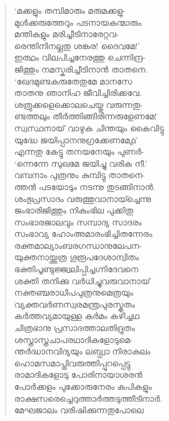 \begin{verse}
‘മക്കളും തമ്പിമാരും മരുമക്കളു-\\
മുള്‍ക്കരുത്തേറും പടനായകന്മാരും\\
മന്തികളും മരിച്ചീടിനാരേറ്റവ-\\
രെന്തിനിനല്ലതു ശങ്കര! ദൈവമേ!’\\
ഇത്ഥം വിലപിച്ചനേരത്തു ചെന്നിന്ദ്ര-\\
ജിത്തും നമസ്കരിച്ചീടിനാന്‍ താതനെ.\\
‘ഖേദമുണ്ടകരുതേതുമേ മാനസേ\\
താതനു ഞാനിഹ ജീവിച്ചിരിക്കവേ.\\
ശത്രുക്കളെക്കൊലചെയ്തു വരുന്നതു-\\
ണ്ടത്തലും തീര്‍ത്തിങ്ങിരിന്നരുളേണമേ!\\
സ്വസ്ഥനായ് വാഴുക ചിന്തയും കൈവിട്ടു\\
യുദ്ധേ ജയിപ്പാനനുഗ്രക്കേണമേ൧’\\
എന്നതു കേട്ടു തനയനേയും പുണര്‍-\\
‘ന്നെന്നേ സുഖമേ ജയിച്ചു വരിക നീ.’\\
വമ്പനാം പുത്രനും കുമ്പിട്ടു താതനെ-\\
ത്തന്‍ പടയോടും നടന്നു തുടങ്ങിനാന്‍.\\
ശംഭുപ്രസാദം വരുത്തുവാനായ്ച്ചെന്നു\\
ജംഭാരിജിത്തും നികുംഭില പുക്കിതു\\
സംഭാരജാലവും സമ്പാദ്യ സാദരം\\
സംഭാവ്യ ഹോംഅമാരംഭിച്ചിതന്നേരം\\
രക്തമാല്യാംബരഗന്ധാനുലേപന-\\
യുക്തനായ്ത്തത്ര ഗൂരൂപദേശാന്വിതം\\
ഭക്തിപൂണ്ടുജ്ജ്വലിപ്പിച്ചഗ്നിദേവനെ\\
ശക്തി തനിക്കു വര്‍ധിച്ചുവരുവാനായ്\\
നക്തഞ്ചരാധിപപുത്രനുമെത്രയും\\
വ്യക്തവര്‍ണസ്വരമന്ത്രപുരസ്കൃതം\\
കര്‍ത്തവ്യമായുള്ള കര്‍മം കഴിച്ചഥ\\
ചിത്രഭാനു പ്രസാദത്താലതിദ്രുതം\\
ശസ്ത്രാസ്ത്രചാപരഥാദികളോടുമെ-\\
ന്തര്‍ദ്ധാനവിദ്യയും ലബ്ധ്വാ നിരാകുലം\\
ഹൊമസമാപ്തിവരുത്തിപ്പുറപ്പെട്ടു\\
രാമാദികളോടു പോരിനായാശരന്‍\\
പോര്‍ക്കളം പുക്കോരുനേരം കപികളും\\
രാക്ഷസരെച്ചെറുത്താര്‍ത്തടുത്തീടിനാര്‍.\\
മേഘജാലം വരിഷിക്കുന്നതുപോലെ\\

\end{verse}

